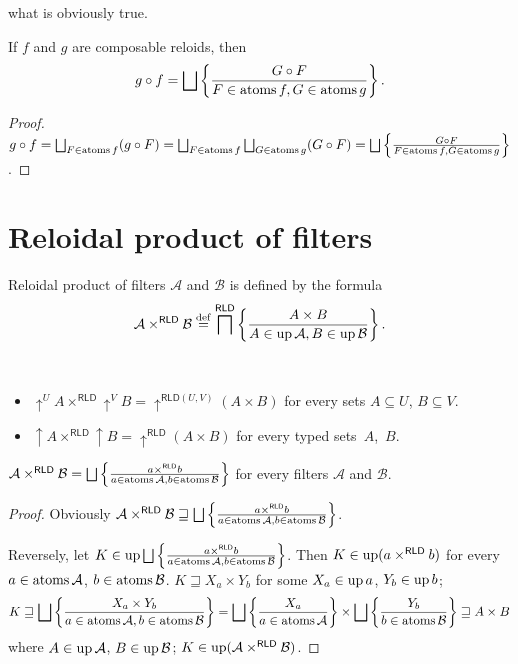 what is obviously true.
\begin{cor}
\label{rld-comp-at}If $f$ and $g$ are composable reloids, then
\[
g\circ f=\bigsqcup\setcond{G\circ F}{F\in\atoms f,G\in\atoms g}.
\]
\end{cor}
\begin{proof}
$g\circ f=\bigsqcup_{F\in\atoms f}(g\circ F)=\bigsqcup_{F\in\atoms f}\bigsqcup_{G\in\atoms g}(G\circ F)=\bigsqcup\setcond{G\circ F}{F\in\atoms f,G\in\atoms g}$.
\end{proof}

\section{Reloidal product of filters}
\begin{defn}
Reloidal product of filters $\mathcal{A}$
and $\mathcal{B}$ is defined by the formula
\[
\mathcal{A}\times^{\mathsf{RLD}}\mathcal{B}\overset{\mathrm{def}}{=}\bigsqcap^{\mathsf{RLD}}\left\{ \frac{A\times B}{A\in\operatorname{up}\mathcal{A},B\in\operatorname{up}\mathcal{B}}\right\}.
\]
\end{defn}
\begin{obvious}
~
\begin{itemize}
\item $\uparrow^{U}A\times^{\mathsf{RLD}}\uparrow^{V}B=\uparrow^{\mathsf{RLD}(U,V)}(A\times B)$
for every sets $A\subseteq U$, $B\subseteq V$.
\item $\uparrow A\times^{\mathsf{RLD}}\uparrow B=\uparrow^{\mathsf{RLD}}(A\times B)$
for every typed sets~$A$,~$B$.\end{itemize}
\end{obvious}
\begin{thm}
\label{rld-prod-t-atoms}$\mathcal{A}\times^{\mathsf{RLD}}\mathcal{B}=\bigsqcup\setcond{a\times^{\mathsf{RLD}}b}{a\in\atoms\mathcal{A},b\in\atoms\mathcal{B}}$
for every filters $\mathcal{A}$ and $\mathcal{B}$.\end{thm}
\begin{proof}
Obviously $\mathcal{A}\times^{\mathsf{RLD}}\mathcal{B}\sqsupseteq\bigsqcup\setcond{a\times^{\mathsf{RLD}}b}{a\in\atoms\mathcal{A},b\in\atoms\mathcal{B}}$.

Reversely, let $K\in\up\bigsqcup\setcond{a\times^{\mathsf{RLD}}b}{a\in\atoms\mathcal{A},b\in\atoms\mathcal{B}}$.
Then $K\in\operatorname{up}(a\times^{\mathsf{RLD}}b)$ for every $a\in\operatorname{atoms}\mathcal{A}$,
$b\in\operatorname{atoms}\mathcal{B}$. $K\sqsupseteq X_{a}\times Y_{b}$ for some
$X_{a}\in\operatorname{up} a$, $Y_{b}\in\operatorname{up} b$; 
\[
K\sqsupseteq\bigsqcup\setcond{X_{a}\times Y_{b}}{a\in\atoms\mathcal{A},b\in\atoms\mathcal{B}}=\bigsqcup\setcond{X_{a}}{a\in\atoms\mathcal{A}}\times\bigsqcup\setcond{Y_{b}}{b\in\atoms\mathcal{B}}\sqsupseteq A\times B
\]
 where $A\in\operatorname{up}\mathcal{A}$, $B\in\operatorname{up}\mathcal{B}$; $K\in\operatorname{up}(\mathcal{A}\times^{\mathsf{RLD}}\mathcal{B})$.\end{proof}
